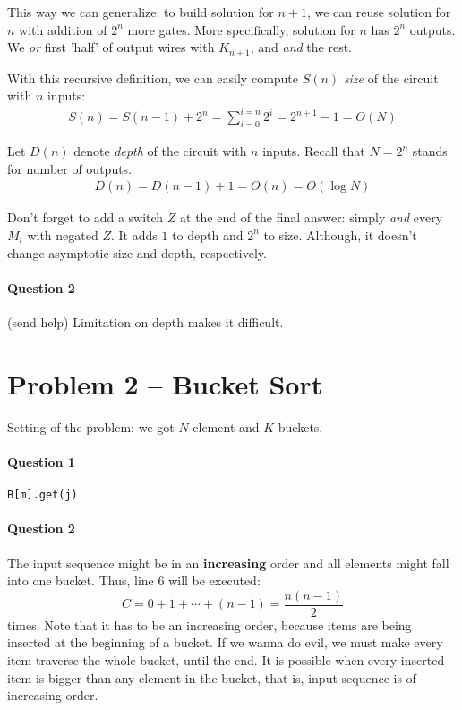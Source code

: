 This way we can generalize: to build solution for $n+1$, we can reuse solution for $n$ with addition of $2^n$ more gates.
More specifically, solution for $n$ has $2^n$ outputs.
We \emph{or} first 'half' of output wires with $K_{n+1}$, and \emph{and} the rest.

With this recursive definition, we can easily compute $S(n)$ \textit{size} of the circuit with $n$ inputs:
\begin{align*}
    S(n) = S(n-1) + 2^{n} = \sum_{i=0}^{i=n} 2^i = 2^{n+1} - 1 = O(N)
\end{align*}

Let $D(n)$ denote \textit{depth} of the circuit with $n$ inputs. Recall that $N=2^n$ stands for number of outputs.
\begin{align*}
    D(n) = D(n-1) + 1 = O(n) = O(\log N)
\end{align*}

Don't forget to add a switch $Z$ at the end of the final answer:
simply \emph{and} every $M_i$ with negated $Z$.
It adds $1$ to depth and $2^n$ to size.
Although, it doesn't change asymptotic size and depth, respectively.


\paragraph{Question 2}
(send help) Limitation on depth makes it difficult.

\section{Problem 2 – Bucket Sort}

Setting of the problem: we got $N$ element and $K$ buckets.

\paragraph{Question 1}
\begin{verbatim}
B[m].get(j)
\end{verbatim}

\paragraph{Question 2}
The input sequence might be in an \textbf{increasing} order and all elements might fall into one bucket.
Thus, line $6$ will be executed:
\begin{equation*}
    C = 0 + 1 + \cdots + (n-1) = \frac{n(n-1)}{2}
\end{equation*}
times.
Note that it has to be an increasing order, because items are being inserted at the beginning of a bucket.
If we wanna do evil, we must make every item traverse the whole bucket, until the end.
It is possible when every inserted item is bigger than any element in the bucket, that is, input sequence is of increasing order.


